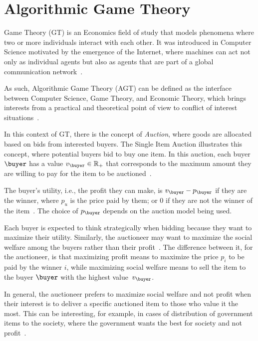 \documentclass[English]{ic-tese-v3}
\begin{document}
\section{Algorithmic Game Theory}
\label{sec:agt}
Game Theory (GT) is an Economics field of study that models phenomena where two or more individuals interact with each other. It was introduced in Computer Science motivated by the emergence of the Internet, where machines can act not only as individual agents but also as agents that are part of a global communication network~\cite{RafaelAGT2015}. 

As such, Algorithmic Game Theory (AGT) can be defined as the interface between Computer Science, Game Theory, and Economic Theory, which brings interests from a practical and theoretical point of view to conflict of interest situations~\cite{TimAGT2007,RafaelAGT2015}. 

In this context of GT, there is the concept of \emph{Auction}, where goods are allocated based on bids from interested buyers. The Single Item Auction illustrates this concept, where potential buyers bid to buy one item. In this auction, each buyer $\buyer$ has a value $v_{\buyer} \in \mathbb R_{+}$ that corresponds to the maximum amount they are willing to pay for the item to be auctioned~\cite{RafaelAGT2015}.

The buyer's utility, i.e., the profit they can make, is $v_{\buyer} - p_{\buyer}$ if they are the winner, where $p_u$ is the price paid by them; or $0$ if they are not the winner of the item~\cite{RafaelAGT2015}. The choice of $p_{\buyer}$ depends on the auction model being used.

Each buyer is expected to think strategically when bidding because they want to maximize their utility. Similarly, the auctioneer may want to maximize the social welfare among the buyers rather than their profit~\cite{TimAGT2007, RafaelAGT2015}. The difference between it, for the auctioneer, is that maximizing profit means to maximize the price $p_i$ to be paid by the winner $i$, while maximizing social welfare means to sell the item to the buyer $\buyer$ with the highest value~$v_{\buyer}$. 

In general, the auctioneer prefers to maximize social welfare and not profit when their interest is to deliver a specific auctioned item to those who value it the most. This can be interesting, for example, in cases of distribution of government items to the society, where the government wants the best for society and not profit~\cite{RafaelAGT2015}.
\end{document}

